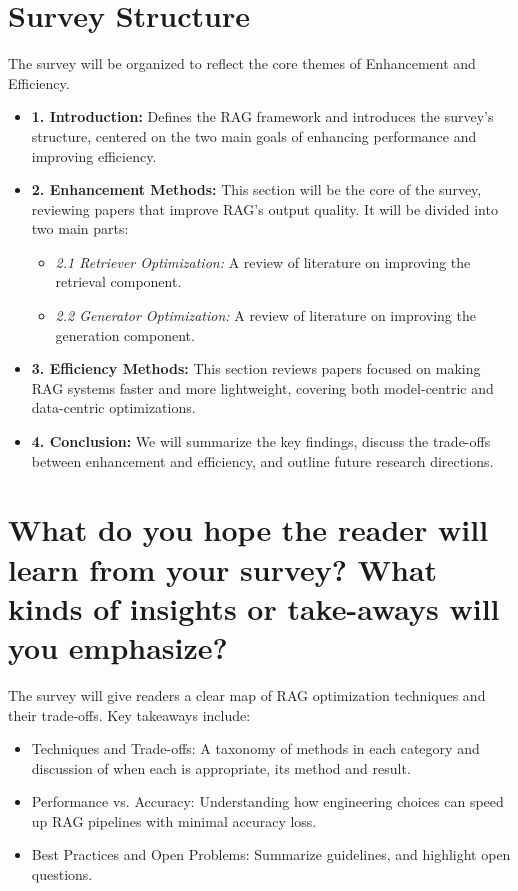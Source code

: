\documentclass[11pt]{article}
\begin{document}
\section{Survey Structure}

The survey will be organized to reflect the core themes of Enhancement and Efficiency.

\begin{itemize}
    \item \textbf{1. Introduction:} Defines the RAG framework and introduces the survey's structure, centered on the two main goals of enhancing performance and improving efficiency.
    
    \item \textbf{2. Enhancement Methods:} This section will be the core of the survey, reviewing papers that improve RAG's output quality. It will be divided into two main parts:
    \begin{itemize}
        \item \textit{2.1 Retriever Optimization:} A review of literature on improving the retrieval component.
        \item \textit{2.2 Generator Optimization:} A review of literature on improving the generation component.
    \end{itemize}
    
    \item \textbf{3. Efficiency Methods:} This section reviews papers focused on making RAG systems faster and more lightweight, covering both model-centric and data-centric optimizations.
    
    \item \textbf{4. Conclusion:} We will summarize the key findings, discuss the trade-offs between enhancement and efficiency, and outline future research directions.
\end{itemize}

\section{What do you hope the reader will learn from your survey? What kinds of insights or take-aways will you emphasize?}

The survey will give readers a clear map of RAG optimization techniques and their trade-offs. Key takeaways include:
\begin{itemize}
  \item Techniques and Trade-offs: A taxonomy of methods in each category and discussion of when each is appropriate, its method and result.
  \item Performance vs. Accuracy: Understanding how engineering choices can speed up RAG pipelines with minimal accuracy loss.
  \item Best Practices and Open Problems: Summarize guidelines, and highlight open questions.

\end{itemize}
\end{document}
